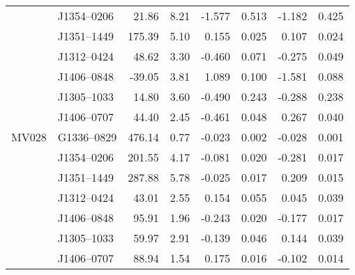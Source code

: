 \begin{table}[h]
\begin{tabular}{llrrrrrr}
	& J1354--0206 &  21.86 & 8.21  & -1.577  & 0.513  & -1.182  &  0.425 \\
	& J1351--1449 & 175.39 & 5.10  &  0.155  & 0.025  &  0.107  &  0.024 \\
	& J1312--0424 &  48.62 & 3.30  & -0.460  & 0.071  & -0.275  &  0.049 \\
	& J1406--0848 & -39.05 & 3.81  &  1.089  & 0.100  & -1.581  &  0.088 \\
	& J1305--1033 &  14.80 & 3.60  & -0.490  & 0.243  & -0.288  &  0.238 \\
	& J1406--0707 &  44.40 & 2.45  & -0.461  & 0.048  &  0.267  &  0.040 \\ \hline
	MV028 & G1336--0829 & 476.14 & 0.77  & -0.023  & 0.002  & -0.028  &  0.001 \\
	& J1354--0206 & 201.55 & 4.17  & -0.081  & 0.020  & -0.281  &  0.017 \\
	& J1351--1449 & 287.88 & 5.78  & -0.025  & 0.017  &  0.209  &  0.015 \\
	& J1312--0424 &  43.01 & 2.55  &  0.154  & 0.055  &  0.045  &  0.039 \\
	& J1406--0848 &  95.91 & 1.96  & -0.243  & 0.020  & -0.177  &  0.017 \\
	& J1305--1033 &  59.97 & 2.91  & -0.139  & 0.046  &  0.144  &  0.039 \\
	& J1406--0707 &  88.94 & 1.54  &  0.175  & 0.016  & -0.102  &  0.014 \\ \bottomrule
	\end{tabular}
\end{table}

